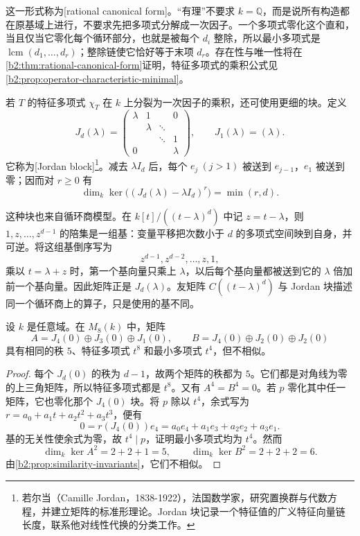 这一形式称为[rational canonical form]。“有理”不要求 \(k=\mathbb Q\)，而是说所有构造都在原基域上进行，不要求先把多项式分解成一次因子。一个多项式零化这个直和，当且仅当它零化每个循环部分，也就是被每个 \(d_i\) 整除，所以最小多项式是 \(\operatorname{lcm}(d_1,\ldots,d_r)\)；整除链使它恰好等于末项 \(d_r\)。存在性与唯一性将在\cref{b2:thm:rational-canonical-form}证明，特征多项式的乘积公式见\cref{b2:prop:operator-characteristic-minimal}。

\ProseParagraphBreak
若 \(T\) 的特征多项式 \(\chi_T\) 在 \(k\) 上分裂为一次因子的乘积，还可使用更细的块。定义
\[
	J_d(\lambda)=
	\begin{pmatrix}
		\lambda&1&&0\\
		&\lambda&\ddots&\\
		&&\ddots&1\\
		0&&&\lambda
	\end{pmatrix},\qquad J_1(\lambda)=(\lambda).
\]
它称为[Jordan block]\footnote{若尔当（Camille Jordan，1838-1922），法国数学家，研究置换群与代数方程，并建立矩阵的标准形理论。Jordan 块记录一个特征值的广义特征向量链长度，联系他对线性代换的分类工作。}。减去 \(\lambda I_d\) 后，每个 \(e_j\ (j>1)\) 被送到 \(e_{j-1}\)，\(e_1\) 被送到零；因而对 \(r\ge0\) 有
\[
	\dim_k\ker\bigl((J_d(\lambda)-\lambda I_d)^r\bigr)=\min(r,d).
\]

这种块也来自循环商模型。在 \(k[t]/((t-\lambda)^d)\) 中记 \(z=t-\lambda\)，则 \(1,z,\ldots,z^{d-1}\) 的陪集是一组基：变量平移把次数小于 \(d\) 的多项式空间映到自身，并可逆。将这组基倒序写为
\[
	z^{d-1},z^{d-2},\ldots,z,1,
\]
乘以 \(t=\lambda+z\) 时，第一个基向量只乘上 \(\lambda\)，以后每个基向量都被送到它的 \(\lambda\) 倍加前一个基向量。因此矩阵正是 \(J_d(\lambda)\)。友矩阵 \(C((t-\lambda)^d)\) 与 Jordan 块描述同一个循环商上的算子，只是使用的基不同。

\begin{proposition}\label{b2:prop:insufficient-similarity-invariants}
	设 \(k\) 是任意域。在 \(M_8(k)\) 中，矩阵
	\[
		A=J_4(0)\oplus J_3(0)\oplus J_1(0),\qquad B=J_4(0)\oplus J_2(0)\oplus J_2(0)
	\]
	具有相同的秩 \(5\)、特征多项式 \(t^8\) 和最小多项式 \(t^4\)，但不相似。
\end{proposition}
\begin{proof}
	每个 \(J_d(0)\) 的秩为 \(d-1\)，故两个矩阵的秩都为 \(5\)。它们都是对角线为零的上三角矩阵，所以特征多项式都是 \(t^8\)。又有 \(A^4=B^4=0\)。若 \(p\) 零化其中任一矩阵，它也零化那个 \(J_4(0)\) 块。将 \(p\) 除以 \(t^4\)，余式写为 \(r=a_0+a_1t+a_2t^2+a_3t^3\)，便有
	\[
		0=r(J_4(0))e_4=a_0e_4+a_1e_3+a_2e_2+a_3e_1.
	\]
	基的无关性使余式为零，故 \(t^4\mid p\)，证明最小多项式均为 \(t^4\)。然而
	\[
		\dim_k\ker A^2=2+2+1=5,\qquad \dim_k\ker B^2=2+2+2=6.
	\]
	由\cref{b2:prop:similarity-invariants}，它们不相似。
\end{proof}

